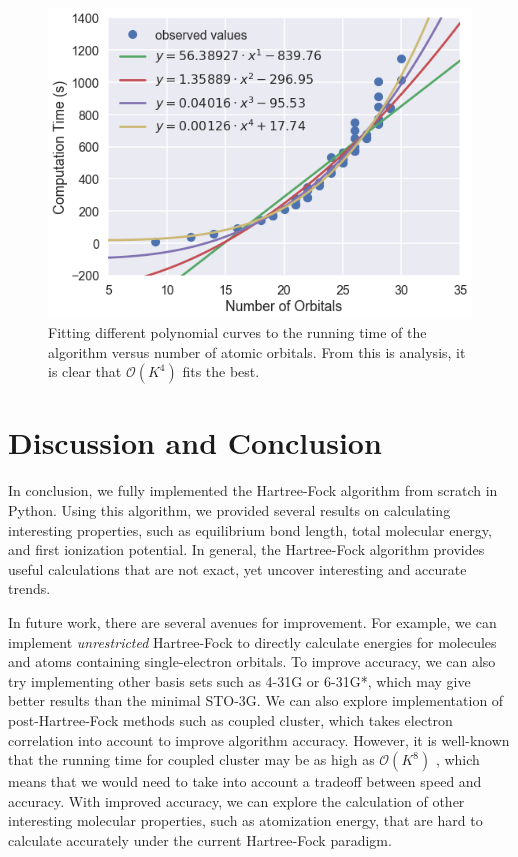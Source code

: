 \documentclass[12pt]{article}
\newcommand{\Oh}{\mathcal{O}}
\begin{document}
\begin{figure}[H]
\begin{center}
\includegraphics[scale=0.5]{img/run-time}
\end{center}
\caption{Fitting different polynomial curves to the running time of the algorithm versus number of atomic orbitals.  From this is analysis, it is clear that $\Oh(K^4)$ fits the best.} \label{run-time}
\end{figure} 

\section{Discussion and Conclusion}

In conclusion, we fully implemented the Hartree-Fock algorithm from scratch in Python.  Using this algorithm, we provided several results on calculating interesting properties, such as equilibrium bond length, total molecular energy, and first ionization potential.  In general, the Hartree-Fock algorithm provides useful calculations that are not exact, yet uncover interesting and accurate trends.  

In future work, there are several avenues for improvement.  For example, we can implement \emph{unrestricted} Hartree-Fock to directly calculate energies for molecules and atoms containing single-electron orbitals.  To improve accuracy, we can also try implementing other basis sets such as 4-31G or 6-31G*, which may give better results than the minimal STO-3G.  We can also explore implementation of post-Hartree-Fock methods such as coupled cluster, which takes electron correlation into account to improve algorithm accuracy.  However, it is well-known that the running time for coupled cluster may be as high as $\Oh(K^8)$ \cite{bartlett1994applications}, which means that we would need to take into account a tradeoff between speed and accuracy.  With improved accuracy, we can explore the calculation of other interesting molecular properties, such as atomization energy, that are hard to calculate accurately under the current Hartree-Fock paradigm.          
\end{document}
